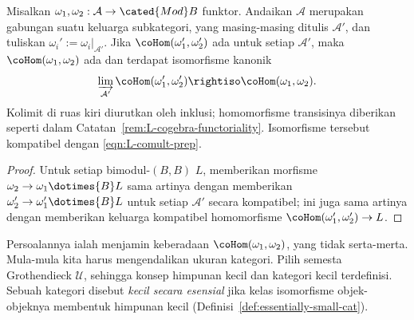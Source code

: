 \begin{proposition}\label{prop:coHom-colim}
	Misalkan
	$\omega_1,\omega_2:\mathcal{A}\to\cated{Mod}B$ funktor. Andaikan
	$\mathcal{A}$ merupakan gabungan suatu keluarga subkategori, yang masing-masing
	ditulis $\mathcal{A}'$, dan tuliskan
	$\omega_i':=\omega_i|_{\mathcal{A}'}$. Jika
	$\coHom(\omega_1',\omega_2')$ ada untuk setiap $\mathcal{A}'$, maka
	$\coHom(\omega_1,\omega_2)$ ada dan terdapat isomorfisme kanonik
	\[ \varinjlim_{\mathcal{A}'} \coHom(\omega'_1, \omega'_2) \rightiso \coHom(\omega_1, \omega_2). \]
	Kolimit di ruas kiri diurutkan oleh inklusi; homomorfisme transisinya
	diberikan seperti dalam Catatan~\ref{rem:L-cogebra-functoriality}.
	Isomorfisme tersebut kompatibel dengan \eqref{eqn:L-comult-prep}.
\end{proposition}
\begin{proof}
	Untuk setiap bimodul-$(B,B)$ $L$, memberikan morfisme
	$\omega_2\to\omega_1\dotimes{B}L$ sama artinya dengan memberikan
	$\omega_2'\to\omega_1'\dotimes{B}L$ untuk setiap $\mathcal{A}'$ secara
	kompatibel; ini juga sama artinya dengan memberikan keluarga kompatibel
	homomorfisme $\coHom(\omega_1',\omega_2')\to L$.
\end{proof}

Persoalannya ialah menjamin keberadaan $\coHom(\omega_1,\omega_2)$, yang
tidak serta-merta. Mula-mula kita harus mengendalikan ukuran
kategori. Pilih semesta Grothendieck $\mathcal{U}$, sehingga konsep
himpunan kecil dan kategori kecil terdefinisi. Sebuah kategori disebut
\emph{kecil secara esensial} jika kelas isomorfisme objek-objeknya
membentuk himpunan kecil (Definisi~\ref{def:essentially-small-cat}).


